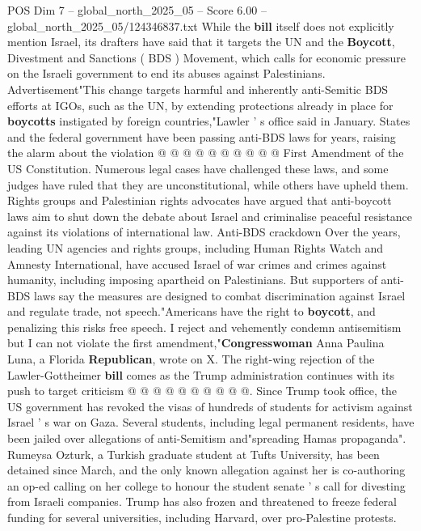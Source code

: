 \begin{textsample}{POS Dim 7 – global\_north\_2025\_05 – Score 6.00 – global\_north\_2025\_05/124346837.txt}
While the \textbf{bill} itself does not explicitly mention Israel, its drafters have said that it targets the UN and the \textbf{Boycott}, Divestment and Sanctions ( BDS ) Movement, which calls for economic pressure on the Israeli government to end its abuses against Palestinians.
Advertisement"This change targets harmful and inherently anti-Semitic BDS efforts at IGOs, such as the UN, by extending protections already in place for \textbf{boycotts} instigated by foreign countries,"Lawler ' s office said in January.
States and the federal government have been passing anti-BDS laws for years, raising the alarm about the violation @ @ @ @ @ @ @ @ @ @ First Amendment of the US Constitution.
Numerous legal cases have challenged these laws, and some judges have ruled that they are unconstitutional, while others have upheld them.
Rights groups and Palestinian rights advocates have argued that anti-boycott laws aim to shut down the debate about Israel and criminalise peaceful resistance against its violations of international law.
Anti-BDS crackdown Over the years, leading UN agencies and rights groups, including Human Rights Watch and Amnesty International, have accused Israel of war crimes and crimes against humanity, including imposing apartheid on Palestinians.
But supporters of anti-BDS laws say the measures are designed to combat discrimination against Israel and regulate trade, not speech."Americans have the right to \textbf{boycott}, and penalizing this risks free speech.
I reject and vehemently condemn antisemitism but I can not violate the first amendment,"\textbf{Congresswoman} Anna Paulina Luna, a Florida \textbf{Republican}, wrote on X.
The right-wing rejection of the Lawler-Gottheimer \textbf{bill} comes as the Trump administration continues with its push to target criticism @ @ @ @ @ @ @ @ @ @.
Since Trump took office, the US government has revoked the visas of hundreds of students for activism against Israel ' s war on Gaza.
Several students, including legal permanent residents, have been jailed over allegations of anti-Semitism and"spreading Hamas propaganda".
Rumeysa Ozturk, a Turkish graduate student at Tufts University, has been detained since March, and the only known allegation against her is co-authoring an op-ed calling on her college to honour the student senate ' s call for divesting from Israeli companies.
Trump has also frozen and threatened to freeze federal funding for several universities, including Harvard, over pro-Palestine protests.

\end{textsample}
